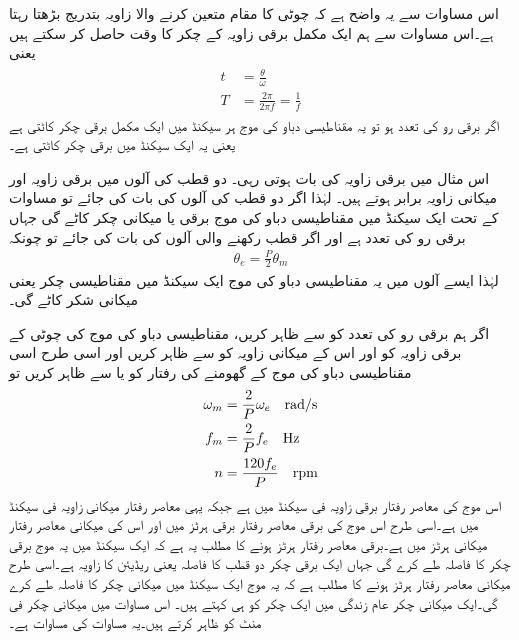اس مساوات سے یہ واضح ہے کہ چوٹی کا مقام متعین کرنے والا زاویہ بتدریج بڑھتا رہتا ہے۔اس مساوات سے ہم ایک مکمل  برقی زاویہ کے چکر کا وقت  حاصل کر سکتے ہیں یعنی
\begin{gather}
\begin{aligned}\label{مساوات_گھومتے_مشین_دوری_وقفہ}
t&=\frac{\theta}{\omega}\\
T&=\frac{2\pi}{2\pi f}=\frac{1}{f}
\end{aligned}
\end{gather}
اگر برقی رو کی تعدد  ہو تو یہ مقناطیسی دباو کی موج ہر  سیکنڈ میں ایک مکمل برقی چکر کاٹتی ہے یعنی یہ ایک سیکنڈ میں  برقی چکر کاٹتی ہے۔

اس مثال میں برقی زاویہ کی بات ہوتی رہی۔ دو قطب کی آلوں میں برقی زاویہ   اور میکانی زاویہ  برابر ہوتے ہیں۔ لہٰذا اگر دو قطب کی آلوں کی بات کی جائے تو مساوات   کے تحت ایک سیکنڈ میں مقناطیسی دباو کی موج  برقی یا میکانی چکر کاٹے گی جہاں  برقی رو کی تعدد ہے اور اگر  قطب رکھنے والی آلوں کی بات کی جائے تو چونکہ
\begin{align}
\theta_e=\frac{P}{2} \theta_m
\end{align}
لہٰذا ایسے آلوں میں یہ مقناطیسی دباو کی موج ایک سیکنڈ میں  مقناطیسی چکر یعنی  میکانی شکر کاٹے گی۔

اگر ہم برقی رو کی تعدد کو  سے ظاہر کریں، مقناطیسی دباو کی موج کی چوٹی کے برقی زاویہ کو   اور اس کے میکانی زاویہ کو  سے ظاہر کریں اور اسی طرح اسی مقناطیسی دباو کی موج کے گھومنے کی رفتار کو  یا  سے ظاہر کریں تو
\begin{gather}
\begin{aligned}\label{مساوات_گھومتے_مشین_برقی_میکانی_رفتار_تعلق}
\omega_m&=\frac{2}{P} \omega_e \quad \si{\radian / \second}\\
f_m&=\frac{2}{P} f_e \quad \si{\hertz}\\
n&=\frac{120 f_e}{P} \quad \textup{rpm}
\end{aligned}
\end{gather}
 اس موج کی معاصر رفتار  برقی زاویہ فی سیکنڈ میں ہے جبکہ   یہی معاصر رفتار میکانی زاویہ فی سیکنڈ میں ہے۔اسی طرح  اس موج کی برقی  معاصر رفتار برقی ہرٹز میں اور  اس کی میکانی معاصر رفتار میکانی ہرٹز میں ہے۔برقی معاصر رفتار   ہرٹز ہونے کا مطلب یہ ہے کہ ایک سیکنڈ میں یہ موج  برقی چکر کا فاصلہ طے کرے گی جہاں ایک برقی چکر دو قطب کا فاصلہ یعنی   ریڈیئن کا زاویہ ہے۔اسی طرح میکانی معاصر رفتار  ہرٹز ہونے کا مطلب ہے کہ یہ موج ایک سیکنڈ میں  میکانی چکر کا فاصلہ طے کرے گی۔ایک میکانی چکر عام زندگی میں ایک چکر کو ہی کہتے ہیں۔ اس مساوات میں  میکانی چکر فی منٹ  کو ظاہر کرتے ہیں۔یہ مساوات  کی مساوات ہے۔

